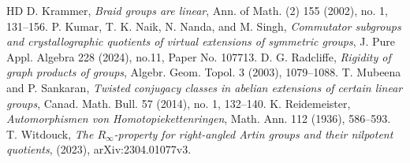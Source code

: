 \documentclass[12pt]{amsart}
\numberwithin{equation}{section}
\begin{document}
\begin{thebibliography}{HD}
  D. Krammer,   {\it Braid groups are linear}, Ann. of Math. (2) 155 (2002), no. 1, 131--156.
 P. Kumar, T. K. Naik, N. Nanda, and M. Singh, {\it Commutator subgroups and crystallographic quotients of virtual extensions of symmetric groups}, J. Pure Appl. Algebra 228 (2024), no.11, Paper No. 107713.
 D. G. Radcliffe, {\it Rigidity of graph products of groups}, Algebr. Geom. Topol.   3 (2003), 1079--1088.
 {T. Mubeena and P. Sankaran}, {\it Twisted conjugacy classes in abelian extensions of certain linear groups}, Canad. Math. Bull.   57 (2014), no. 1, 132--140.
 K. Reidemeister, {\it Automorphismen von Homotopiekettenringen}, Math. Ann. 112 (1936), 586--593.
 T. Witdouck, {\it The $R_\infty$-property for right-angled Artin groups and their nilpotent quotients}, (2023), arXiv:2304.01077v3.
\end{thebibliography}
\bigskip
\end{document}
